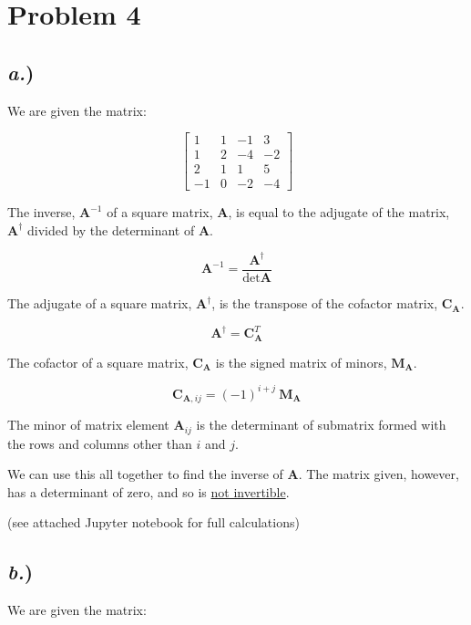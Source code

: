 \documentclass{article}
\begin{document}

\section*{Problem 4}

\subsection*{\textit{a.})}

We are given the matrix:

$$\begin{bmatrix}
1 	&	1	&	-1	&	3	\\
1	&	2	&	-4	&	-2	\\
2	&	1	&	1	&	5	\\
-1	&	0	&	-2	&	-4	\end{bmatrix}$$

The inverse, $\textbf{A}^{-1}$ of a square matrix, $\textbf{A}$,  is equal to the adjugate of the matrix, $\textbf{A}^{\dagger}$ divided by the determinant of $\textbf{A}$. 

$$ \textbf{A}^{-1} = \frac{\textbf{A}^{\dagger}}{\det{\textbf{A}}} $$

The adjugate of a square matrix, $\textbf{A}^{\dagger}$, is the transpose of the cofactor matrix, $\textbf{C}_{\textbf{A}}$.

$$ \textbf{A}^{\dagger} = \textbf{C}_{\textbf{A}}^T $$

The cofactor of a square matrix, $\textbf{C}_{\textbf{A}}$ is the signed matrix of minors, $\textbf{M}_{\textbf{A}}$.

$$ \textbf{C}_{\textbf{A},ij} = (-1)^{i+j} \ \textbf{M}_{\textbf{A}} $$

The minor of matrix element $\textbf{A}_{ij}$ is the determinant of submatrix formed with the rows and columns other than $i$ and $j$.

We can use this all together to find the inverse of $\textbf{A}$. The matrix given, however, has a determinant of zero, and so is \underline{not invertible}.

(see attached Jupyter notebook for full calculations)


\subsection*{\textit{b.})}

We are given the matrix:
\end{document}
